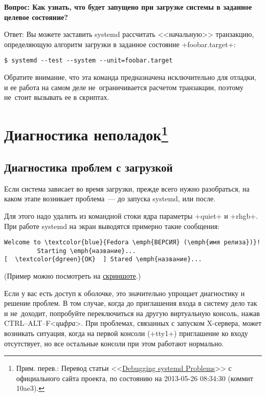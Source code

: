 \documentclass[10pt,oneside,a4paper]{article}
\newcommand{\sfnote}[1]{\texorpdfstring{\protect\footnote%
	{Прим. перев.: #1}}{}}
\newcommand{\qna}[1]{\medskip\par\textbf{Вопрос: #1}\par Ответ:}
\begin{document}
\qna{Как узнать, что будет запущено при загрузке системы в заданное целевое
состояние?}
Вы можете заставить systemd рассчитать <<начальную>> транзакцию, определяющую
алгоритм загрузки в заданное состояние +foobar.target+:
\begin{Verbatim}
$ systemd --test --system --unit=foobar.target
\end{Verbatim}

Обратите внимание, что эта команда предназначена исключительно для отладки, и ее
работа на самом деле не~ограничивается расчетом транзакции, поэтому не~стоит
вызывать ее в скриптах.

\section{Диагностика неполадок\sfnote{Перевод статьи
<<\href{http://freedesktop.org/wiki/Software/systemd/Debugging}{Debugging
systemd Problems}>> с официального сайта проекта, по состоянию на 2013-05-26
08:34:30 (коммит 10ae3).}}

\subsection{Диагностика проблем с загрузкой}

Если система зависает во время загрузки, прежде всего нужно разобраться, на
каком этапе возникает проблема~--- до запуска systemd, или после.

Для этого надо удалить из командной стоки ядра параметры +quiet+ и +rhgb+. При
работе systemd на экран выводятся примерно такие сообщения:
\begin{Verbatim}[commandchars=\\\{\}]
Welcome to \textcolor{blue}{Fedora \emph{ВЕРСИЯ} (\emph{имя релиза})}!
         Starting \emph{название}...
[  \textcolor{dgreen}{OK}  ] Stared \emph{название}...
\end{Verbatim}
(Пример можно посмотреть на
\href{http://freedesktop.org/wiki/Software/systemd/Debugging?action=AttachFile&do=view&target=f17boot.png}{скриншоте}.)

Если у вас есть доступ к оболочке, это значительно упрощает диагностику и
решение проблем. В том случае, когда до приглашения входа в систему дело так и
не~доходит, попробуйте переключиться на другую виртуальную консоль, нажав
CTRL--ALT--F<\emph{цифра}>. При проблемах, связанных с запуском X-сервера, может
возникать ситуация, когда на первой консоли (+tty1+) приглашение ко входу
отсутствует, но все остальные консоли при этом работают нормально.
\end{document}
